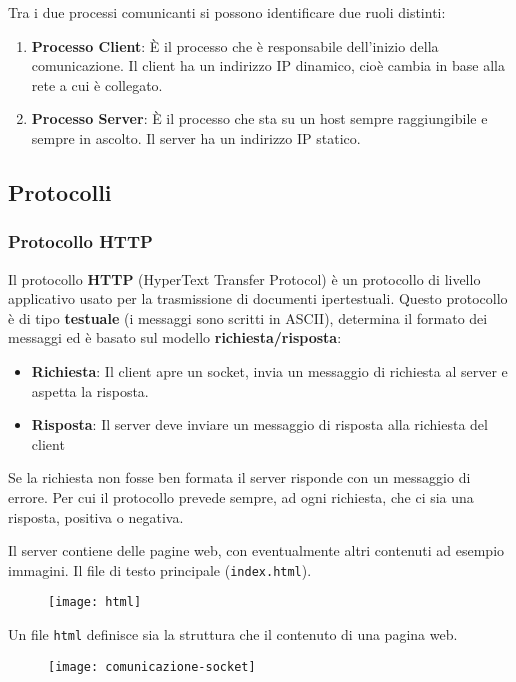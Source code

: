 \documentclass[a4paper]{article}
\begin{document}
\noindent
Tra i due processi comunicanti si possono identificare due ruoli distinti:
\begin{enumerate}
  \item \textbf{Processo Client}: È il processo che è responsabile dell'inizio della
    comunicazione. Il client ha un indirizzo IP dinamico, cioè cambia in base alla
    rete a cui è collegato.

  \item \textbf{Processo Server}: È il processo che sta su un host sempre raggiungibile
    e sempre in ascolto. Il server ha un indirizzo IP statico.
\end{enumerate}

\subsection{Protocolli}
\subsubsection{Protocollo HTTP}
Il protocollo \textbf{HTTP} (HyperText Transfer Protocol) è un protocollo di livello
applicativo usato per la trasmissione di documenti ipertestuali. Questo protocollo
è di tipo \textbf{testuale} (i messaggi sono scritti in ASCII),
determina il formato dei messaggi ed è basato sul modello \textbf{richiesta/risposta}:
\begin{itemize}
  \item \textbf{Richiesta}: Il client apre un socket, invia un messaggio di richiesta
    al server e aspetta la risposta.
  \item \textbf{Risposta}: Il server deve inviare un messaggio di risposta alla richiesta 
    del client
\end{itemize}
Se la richiesta non fosse ben formata il server risponde con un messaggio di errore.
Per cui il protocollo prevede sempre, ad ogni richiesta, che ci sia una risposta, positiva
o negativa.

Il server contiene delle pagine web, con eventualmente altri contenuti ad esempio immagini.
Il file di testo principale (\texttt{index.html}).
\begin{figure}[H]
  \centering
  \texttt{[image: html]}
\end{figure}
\noindent
Un file \texttt{html} definisce sia la struttura che il contenuto di una pagina web.
\begin{figure}[H]
  \centering
  \texttt{[image: comunicazione-socket]}
\end{figure}
\end{document}
